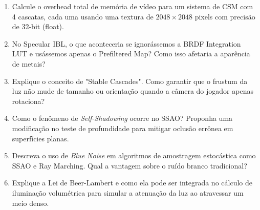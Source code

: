 \begin{enumerate}
    \item Calcule o overhead total de memória de vídeo para um sistema de CSM com 4 cascatas, cada uma usando uma textura de $2048 \times 2048$ pixels com precisão de 32-bit (float).
    \item No Specular IBL, o que aconteceria se ignorássemos a BRDF Integration LUT e usássemos apenas o Prefiltered Map? Como isso afetaria a aparência de metais?
    \item Explique o conceito de "Stable Cascades". Como garantir que o frustum da luz não mude de tamanho ou orientação quando a câmera do jogador apenas rotaciona?
    \item Como o fenômeno de \textit{Self-Shadowing} ocorre no SSAO? Proponha uma modificação no teste de profundidade para mitigar oclusão errônea em superfícies planas.
    \item Descreva o uso de \textit{Blue Noise} em algoritmos de amostragem estocástica como SSAO e Ray Marching. Qual a vantagem sobre o ruído branco tradicional?
    \item Explique a Lei de Beer-Lambert e como ela pode ser integrada no cálculo de iluminação volumétrica para simular a atenuação da luz ao atravessar um meio denso.
\end{enumerate}


